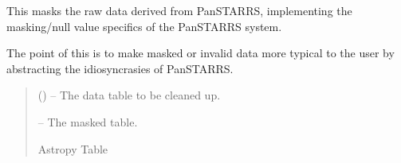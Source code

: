 \documentclass[letterpaper,11pt,english]{sphinxmanual}
\begin{document}
\begin{savenotes}
\begin{fulllineitems}
\begin{savenotes}
\begin{fulllineitems}
\end{fulllineitems}\end{savenotes}


\begin{savenotes}\begin{fulllineitems}
\label{\detokenize{code/opihiexarata.photometry.panstarrs:opihiexarata.photometry.panstarrs.PanstarrsMastWebAPIEngine._mask_table_data}}
\pysigstartsignatures
{}
\pysigstopsignatures
\sphinxAtStartPar
This masks the raw data derived from PanSTARRS, implementing the
masking/null value specifics of the PanSTARRS system.

\sphinxAtStartPar
The point of this is to make masked or invalid data more typical to
the user by abstracting the idiosyncrasies of PanSTARRS.
\begin{quote}\begin{description}
\sphinxAtStartPar
{} () – The data table to be cleaned up.

\sphinxAtStartPar
{} – The masked table.

\sphinxAtStartPar
Astropy Table

\end{description}\end{quote}

\end{fulllineitems}\end{savenotes}



\end{fulllineitems}
\end{savenotes}
\end{document}
